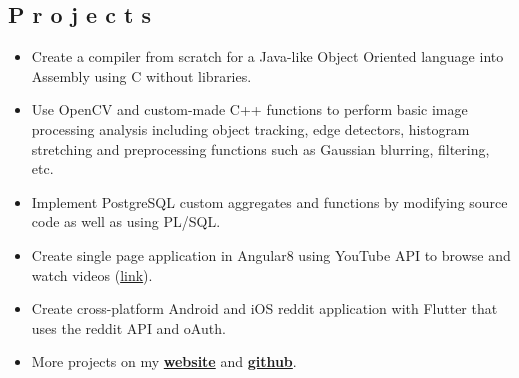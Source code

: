 \documentclass{resume}
\begin{document}

\subsection{P r o j e c t s}
\begin{itemize}
\item \small Create a compiler from scratch for a Java-like Object Oriented language into Assembly using C without libraries.
\item \small Use OpenCV and custom-made C++ functions to perform basic image processing analysis including object tracking, edge detectors, histogram stretching and preprocessing functions such as Gaussian blurring, filtering, etc.
\item \small Implement PostgreSQL custom aggregates and functions by modifying source code as well as using PL/SQL.
\item \small Create single page application in Angular8 using YouTube API to browse and watch videos (\href{https://github.com/mushfiq814/youtube-data-api-dogVids}{link}).
\item \small Create cross-platform Android and iOS reddit application with Flutter that uses the reddit API and oAuth.
\item \small More projects on my \href{https://mushfiqmahmud.com/html/projects}{\textbf{website}} and \href{https://github.com/mushfiq814}{\textbf{github}}.
\end{itemize}

\end{document}
